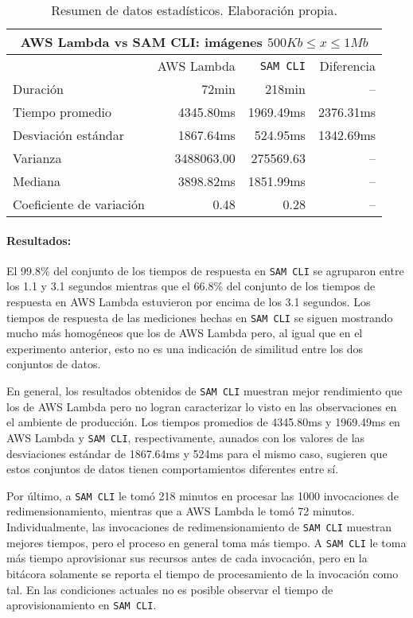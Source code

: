 \begin{table}[h]
    \centering
    \begin{tabular}{l|r|r|r}
        \toprule[1.5pt]
         \multicolumn{4}{c}{\textbf{AWS Lambda vs SAM CLI: imágenes $500Kb \leq x \leq 1Mb$}} \\
         \midrule
         & AWS Lambda & \texttt{SAM CLI} & Diferencia \\ 
         \midrule
        Duración & 72min & 218min & -- \\
        Tiempo promedio  & 4345.80ms & 1969.49ms & 2376.31ms\\
        Desviación estándar & 1867.64ms & 524.95ms & 1342.69ms \\
        Varianza & 3488063.00 & 275569.63 & -- \\
        Mediana & 3898.82ms & 1851.99ms & -- \\
        Coeficiente de variación & 0.48 & 0.28 & -- \\                        
        \bottomrule[1.5pt]
    \end{tabular}
    \caption[AWS Lambda vs SAM CLI: imágenes $500Kb \leq x \leq 1Mb$]{Resumen de datos estadísticos. Elaboración propia.}
    \label{table:sam-datos-estadisticos-hasta-1mb}
\end{table}

\paragraph{Resultados:} El 99.8\% del conjunto de los tiempos de respuesta en \texttt{SAM CLI} se agruparon entre los 1.1 y 3.1 segundos mientras que el 66.8\% del conjunto de los tiempos de respuesta en AWS Lambda estuvieron por encima de los 3.1 segundos. Los tiempos de respuesta de las mediciones hechas en \texttt{SAM CLI} se siguen mostrando mucho más homogéneos que los de AWS Lambda pero, al igual que en el experimento anterior, esto no es una indicación de similitud entre los dos conjuntos de datos. 

En general, los resultados obtenidos de \texttt{SAM CLI} muestran mejor rendimiento que los de AWS Lambda pero no logran caracterizar lo visto en las observaciones en el ambiente de producción. Los tiempos promedios de 4345.80ms y 1969.49ms en AWS Lambda y \texttt{SAM CLI}, respectivamente, aunados con los valores de las desviaciones estándar de 1867.64ms y 524ms para el mismo caso, sugieren que estos conjuntos de datos tienen comportamientos diferentes entre sí.

Por último, a \texttt{SAM CLI} le tomó 218 minutos en procesar las 1000 invocaciones de redimensionamiento, mientras que a AWS Lambda le tomó 72 minutos. Individualmente, las invocaciones de redimensionamiento de \texttt{SAM CLI} muestran mejores tiempos, pero el proceso en general toma más tiempo. A \texttt{SAM CLI} le toma más tiempo aprovisionar sus recursos antes de cada invocación, pero en la bitácora solamente se reporta el tiempo de procesamiento de la invocación como tal. En las condiciones actuales no es posible observar el tiempo de aprovisionamiento en \texttt{SAM CLI}.


